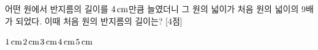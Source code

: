 어떤 원에서 반지름의 길이를 $4\mkern3mu \mathrm{cm}$만큼 늘였더니 그 원의 넓이가 처음 원의 넓이의 $9$배가 되었다. 이때 처음 원의 반지름의 길이는? \mbox{[4점]}
\begin{choices32}{$1\mkern3mu \mathrm{cm}$}{$2\mkern3mu \mathrm{cm}$}{$3\mkern3mu \mathrm{cm}$}{$4\mkern3mu \mathrm{cm}$}{$5\mkern3mu \mathrm{cm}$}\end{choices32}
